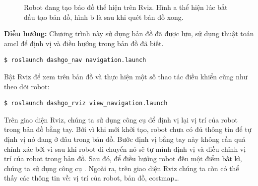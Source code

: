 \begin{figure}[htbp]
    \centering
    \hspace{8pt}
    \caption[Robot đang tạo bảo đồ thể hiện trên Rviz]{Robot đang tạo bảo đồ thể hiện trên Rviz. Hình a thể hiện lúc bắt đầu tạo bản đồ, hình b là sau khi quét bản đồ xong.}
    \label{fig:mapping}
\end{figure}

\textbf{Điều hướng:} Chương trình này sử dụng bản đồ đã được lưu, sử dụng thuật toán amcl để định vị và điều hướng trong bản đồ đã biết.
\begin{lstlisting}
$ roslaunch dashgo_nav navigation.launch
\end{lstlisting}

Bật Rviz để xem trên bản đồ và thực hiện một số thao tác điều khiển cũng như theo dõi robot:
\begin{lstlisting}
$ roslaunch dashgo_rviz view_navigation.launch
\end{lstlisting}
Trên giao diện Rviz, chúng ta sử dụng công cụ  để định vị lại vị trí của robot trong bản đồ bằng tay.
Bởi vì khi mới khởi tạo, robot chưa có đủ thông tin để tự định vị nó đang ở đâu trong bản đồ. Bước định vị bằng tay này không cần quá chính xác bởi vì sau khi robot di chuyển nó sẽ tự mình định vị và điều chỉnh vị trí của robot trong bản đồ. Sau đó, để điều hướng robot đến một điểm bất kì, chúng ta sử dụng công cụ . Ngoài ra, trên giao diện Rviz chúng ta còn có thể thấy các thông tin về: vị trí của robot, bản đồ, costmap\dots

